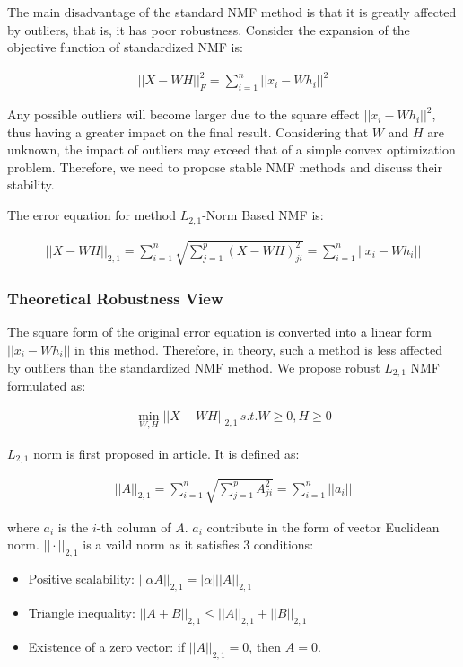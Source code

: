 The main disadvantage of the standard NMF method is that it is greatly affected by outliers, that is, it has poor robustness. Consider the expansion of the objective function of standardized NMF is:

\begin{align}
    ||X-WH||_F^2 = \sum_{i=1}^n||x_i-Wh_i||^2
\end{align}

Any possible outliers will become larger due to the square effect $||x_i-Wh_i||^2$, thus having a greater impact on the final result. Considering that $W$ and $H$ are unknown, the impact of outliers may exceed that of a simple convex optimization problem\cite{kong2011robust}. Therefore, we need to propose stable NMF methods and discuss their stability.

The error equation for method $L_{2,1}$-Norm Based NMF is:

\begin{align}
    ||X-WH||_{2,1} = \sum_{i=1}^n\sqrt{\sum_{j=1}^p(X-WH)_{ji}^2} = \sum_{i=1}^n||x_i-Wh_i||
\end{align}

\subsubsection{Theoretical Robustness View}

The square form of the original error equation is converted into a linear form $||x_i-Wh_i||$ in this method. Therefore, in theory, such a method is less affected by outliers than the standardized NMF method. We propose robust $L_{2,1}$ NMF formulated as:

\begin{align}
    \min_{W,H}||X-WH||_{2,1} \, s.t. W\geq 0, H\geq 0 \label{eq:L21 goal}
\end{align}

$L_{2,1}$ norm is first proposed in article\cite{ding2006r}. It is defined as:

\begin{align*}
    ||A||_{2,1}= \sum_{i=1}^n \sqrt{\sum_{j=1}^p A_{ji}^2} = \sum_{i=1}^n ||a_i||
\end{align*}

where $a_i$ is the $i$-th column of $A$. $a_i$ contribute in the form of vector Euclidean norm. $||\cdot||_{2,1}$ is a vaild norm as it satisfies 3 conditions:

\begin{itemize}
    \item Positive scalability: $||\alpha A||_{2,1} = |\alpha|||A||_{2,1}$
    \item Triangle inequality: $||A+B||_{2,1}\leq ||A||_{2,1} + ||B||_{2,1}$
    \item Existence of a zero vector: if $||A||_{2,1} = 0$, then $A=0$.
\end{itemize}

